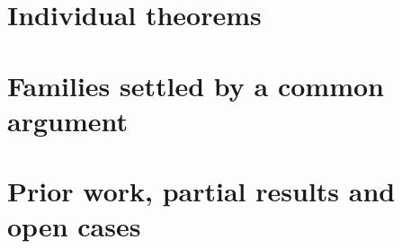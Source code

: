 \documentclass[11pt]{article}
\theoremstyle{remark}\newtheorem{remark}[theorem]{Remark}
\begin{document}
\part{Individual theorems}\label{part:three}




\part{Families settled by a common argument}\label{part:four}


\part{Prior work, partial results and open cases}\label{part:five}


\appendix



\end{document}
